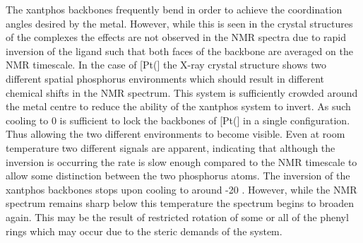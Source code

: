 The xantphos backbones frequently bend in order to achieve the coordination angles desired by the metal.  However, while this is seen in the crystal structures of the complexes the effects are not observed in the NMR spectra due to rapid inversion of the ligand such that both faces of the backbone are averaged on the NMR timescale.  In the case of [Pt(\Phthixantphos{}] the X-ray crystal structure shows two different spatial phosphorus environments which should result in different chemical shifts in the \phosphorus{} NMR spectrum.  This system is sufficiently crowded around the metal centre to reduce the ability of the xantphos system to invert.  As such cooling to 0 \degC{} is sufficient to lock the backbones of [Pt(\Phthixantphos{}] in a single configuration.  Thus allowing the two different \phosphorus{} environments to become visible.  Even at room temperature two different signals are apparent, indicating that although the inversion is occurring the rate is slow enough compared to the NMR timescale to allow some distinction between the two phosphorus atoms.  The inversion of the xantphos backbones stops upon cooling to around -20 \degC.  However, while the \phosphorus{} NMR spectrum remains sharp below this temperature the \proton{} spectrum begins to broaden again.  This may be the result of restricted rotation of some or all of the phenyl rings which may occur due to the steric demands of the system.  

